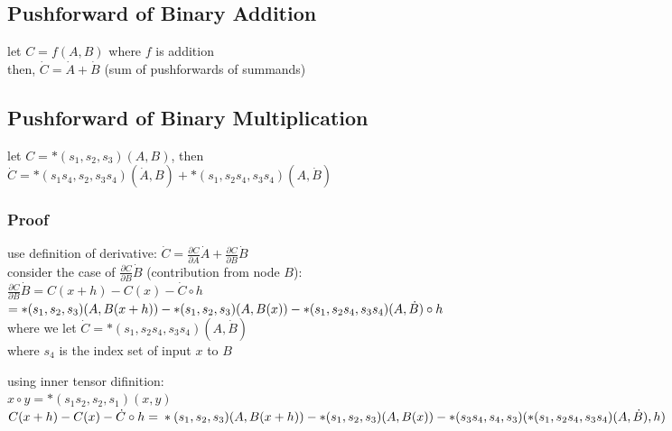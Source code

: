 \documentclass[8pt]{extarticle}
\begin{document}
\begin{multicols*}{2}
  \vfill\null
  \columnbreak

  \subsection{Pushforward of Binary Addition}
  let $C=f(A,B)$ where $f$ is addition\\
  then, $\dot{C}=\dot{A} + \dot{B}$ (sum of pushforwards of summands) 

  \vfill\null
  \columnbreak

  \subsection{Pushforward of Binary Multiplication}
  let $C=*(s_1,s_2,s_3)(A,B)$, then\\
  $\dot{C} = *(s_1 s_4, s_2, s_3 s_4)(\dot{A}, B) + *(s_1, s_2 s_4, s_3 s_4)(A, \dot{B})$

  \subsubsection{Proof}
  use definition of derivative: $\dot{C} = \frac{\partial C}{\partial A} \dot{A} + \frac{\partial C}{\partial B} \dot{B}$\\
  consider the case of $\frac{\partial C}{\partial B} \dot{B}$ (contribution from node $B$):\\

  $\frac{\partial C}{\partial B} \dot{B} = C(x+h) - C(x) - \dot{C} \circ h$\\
  $= *(s_1, s_2, s_3)(A, B(x+h))\\
  - *(s_1, s_2, s_3)(A, B(x))\\
  - *(s_1, s_2 s_4, s_3 s_4)(A, \dot{B}) \circ h$\\

  where we let $\dot{C}= *(s_1, s_2 s_4, s_3 s_4)(A,\dot{B})$\\
  where $s_4$ is the index set of input $x$ to $B$

  using inner tensor difinition:\\
  $x \circ y = *(s_1 s_2, s_2, s_1)(x,y)$\\

  $C(x+h) - C(x) - \dot{C} \circ h =\\
  *(s_1, s_2, s_3)(A, B(x+h))\\
  - *(s_1, s_2, s_3)(A, B(x))\\
  - *(s_3 s_4, s_4, s_3)(*(s_1, s_2 s_4, s_3 s_4)(A, \dot{B}), h)$\\


\end{multicols*}
\end{document}
